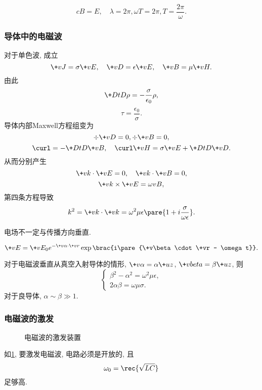 \documentclass[hidelinks]{ctexart}
\begin{document}
\begin{finale}
    \[ cB = E, \quad \lambda = 2\pi, \omega T = 2\pi, T = \frac{2\pi}{\omega}. \]
\end{finale}


\subsubsection{导体中的电磁波} %
\label{ssub:导体中的电磁波}

对于单色波, 成立
\[ \+vJ = \sigma \+vE,\quad \+vD = \epsilon \+vE, \quad \+vB = \mu \+vH. \]
由此
\[ \+DtD\rho = -\frac{\sigma}{\epsilon_0}\rho, \]
\[ \tau = \frac{\epsilon_0}{\sigma}. \]
导体内部Maxwell方程组变为
\[ \div\+vD = 0, \div\+vB = 0, \]
\[ \curl = -\+DtD{\+vB},\quad \curl\+vH = \sigma \+vE + \+DtD{\+vD}. \]
从而分别产生
\[ \+vk \cdot \+vE = 0,\quad \+vk \cdot\+vB = 0, \]
\[ \+vk \times \+vE = \omega vB, \]
第四条方程导致
\[ k^2 = \+vk\cdot\+vk = \omega^2 \mu \epsilon \pare{1+i\frac{\sigma}{\omega \epsilon}}. \]
\begin{pitfall}
    电场不一定与传播方向垂直.
\end{pitfall}
\[ \+vE = \+vE_0 e^{-\+v\alpha\cdot\+vr} \exp\brac{i\pare{\+v\beta\cdot\+vr - \omega t}}. \]

\begin{ex}
    对于电磁波垂直从真空入射导体的情形, $\+v\alpha = \alpha \+uz$, $\+vbeta = \beta\+uz$, 则
    \[ \begin{cases}
        \beta^2 - \alpha^2 = \omega^2\mu\epsilon,\\
        2\alpha \beta = \omega \mu \sigma.
    \end{cases} \]
    对于良导体, $\alpha \sim \beta \gg 1$.
\end{ex}


\subsubsection{电磁波的激发} %
\label{ssub:电磁波的激发}

\begin{figure}[ht]
    \centering
    \caption{电磁波的激发装置}
    \label{fig:电磁波的激发装置}
\end{figure}
如\cref{fig:电磁波的激发装置}, 要激发电磁波, 电路必须是开放的, 且
\[ \omega_0 = \rec{\sqrt{LC}} \]
足够高.
\end{document}
